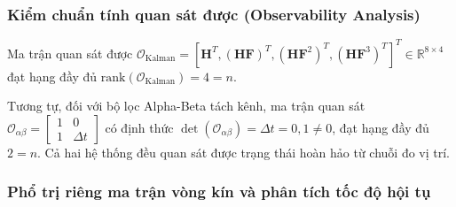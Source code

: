 \begin{table}[H]
\centering
\caption{Đối chiếu đặc tính mô hình không gian trạng thái giữa Kalman và Alpha-Beta}
\label{tab:w14-model-compare}
\end{table}

\subsubsection{Kiểm chuẩn tính quan sát được (Observability Analysis)}

\hspace{0.5cm} Ma trận quan sát được $\mathcal{O}_{\text{Kalman}} = [\mathbf{H}^T, (\mathbf{H}\mathbf{F})^T, (\mathbf{H}\mathbf{F}^2)^T, (\mathbf{H}\mathbf{F}^3)^T]^T \in \mathbb{R}^{8 \times 4}$ đạt hạng đầy đủ $\text{rank}(\mathcal{O}_{\text{Kalman}}) = 4 = n$.

Tương tự, đối với bộ lọc Alpha-Beta tách kênh, ma trận quan sát $\mathcal{O}_{\alpha\beta} = \begin{bmatrix} 1 & 0 \\ 1 & \Delta t \end{bmatrix}$ có định thức $\det(\mathcal{O}_{\alpha\beta}) = \Delta t = 0{,}1 \neq 0$, đạt hạng đầy đủ $2 = n$. Cả hai hệ thống đều quan sát được trạng thái hoàn hảo từ chuỗi đo vị trí.

\subsubsection{Phổ trị riêng ma trận vòng kín và phân tích tốc độ hội tụ}

